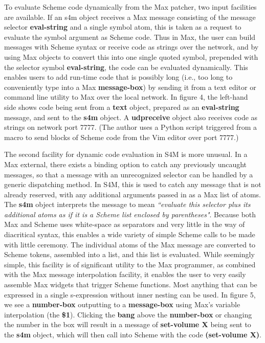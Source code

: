 \documentclass[acmsmall]{acmart}
\begin{document}
To evaluate Scheme code dynamically from the Max patcher, two input facilities
are available. If an s4m object receives a Max message consisting of the 
message selector \textbf{eval-string} and a single symbol atom, 
this is taken as a request to evaluate the symbol argument as Scheme code. 
Thus in Max, the user can build messages
with Scheme syntax or receive code as strings over the network, and by
using Max objects to convert this into one single quoted symbol, prepended
with the selector symbol \textbf{eval-string}, the code can be evaluated dynamically.
This enables users to add run-time code that is possibly long 
(i.e., too long to conveniently type into a Max \textbf{message-box}) by
sending it from a text editor or command line utility to Max over the 
local network. In figure 4, the left-hand side shows code being sent
from a \textbf{text} object, prepared as an \textbf{eval-string} message, and sent to
the \textbf{s4m} object. A \textbf{udpreceive} object also receives code as strings
on network port 7777. (The author uses a Python script triggered
from a macro to send blocks of Scheme code from the Vim editor over port 7777.)

The second facility for dynamic code evaluation in S4M is more unusual.
In a Max external, there exists a binding option to catch any previously
uncaught messages, so that a message with an unrecognized selector 
can be handled by a generic dispatching method. In S4M, this is used to 
catch any message that is not already reserved, with any additional 
arguments passed in as a Max list of atoms.  The \textbf{s4m} object interprets
the message to mean \textit{``evaluate this selector plus its additional atoms 
as if it is a Scheme list enclosed by parentheses"}.
Because both Max and Scheme uses white-space as separators and very little
in the way of diacritical syntax, this enables a wide variety
of simple Scheme calls to be made with little ceremony. The
individual atoms of the Max message are converted to Scheme tokens,
assembled into a list, and this list is evaluated. While seemingly simple,
this facility is of significant utility to the Max programmer, as combined
with the Max message interpolation facility, it enables the user to very
easily assemble Max widgets that trigger Scheme functions. Most anything that
can be expressed in a single s-expression without inner nesting can be used.
In figure 5, we see a \textbf{number-box} outputting to a \textbf{message-box} using Max's 
variable interpolation (the \textbf{\$1}). 
Clicking the \textbf{bang} above the \textbf{number-box} or changing the number in 
the box will result in a message of 
\textbf{set-volume X} being sent to the \textbf{s4m} object, which will then call
into Scheme with the code \textbf{(set-volume X)}.
\end{document}
